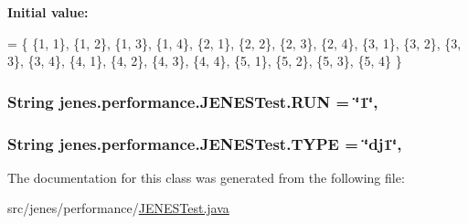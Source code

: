 {\bfseries Initial value\-:}
\begin{DoxyCode}
= \{
        \{1, 1\}, \{1, 2\}, \{1, 3\}, \{1, 4\}, \{2, 1\}, \{2, 2\}, \{2, 3\}, \{2, 4\}, \{3, 1\}, \{3, 2\}, \{3, 3\},
        \{3, 4\}, \{4, 1\}, \{4, 2\}, \{4, 3\}, \{4, 4\}, \{5, 1\}, \{5, 2\}, \{5, 3\}, \{5, 4\}
    \}
\end{DoxyCode}
\hypertarget{classjenes_1_1performance_1_1_j_e_n_e_s_test_a5c84bd75d825c995f6bebb79b45df6c1}{
\subsubsection[{R\-U\-N}]{\setlength{\rightskip}{0pt plus 5cm}String jenes.\-performance.\-J\-E\-N\-E\-S\-Test.\-R\-U\-N = \char`\"{}1\char`\"{}\hspace{0.3cm}{\ttfamily [static]}, {\ttfamily [protected]}}}\label{classjenes_1_1performance_1_1_j_e_n_e_s_test_a5c84bd75d825c995f6bebb79b45df6c1}
\hypertarget{classjenes_1_1performance_1_1_j_e_n_e_s_test_a6b35bbf22096ec3923e78d2bc407c2f4}{
\subsubsection[{T\-Y\-P\-E}]{\setlength{\rightskip}{0pt plus 5cm}String jenes.\-performance.\-J\-E\-N\-E\-S\-Test.\-T\-Y\-P\-E = \char`\"{}dj1\char`\"{}\hspace{0.3cm}{\ttfamily [static]}, {\ttfamily [protected]}}}\label{classjenes_1_1performance_1_1_j_e_n_e_s_test_a6b35bbf22096ec3923e78d2bc407c2f4}


The documentation for this class was generated from the following file\-:\begin{DoxyCompactItemize}
\item 
src/jenes/performance/\hyperlink{_j_e_n_e_s_test_8java}{J\-E\-N\-E\-S\-Test.\-java}\end{DoxyCompactItemize}
